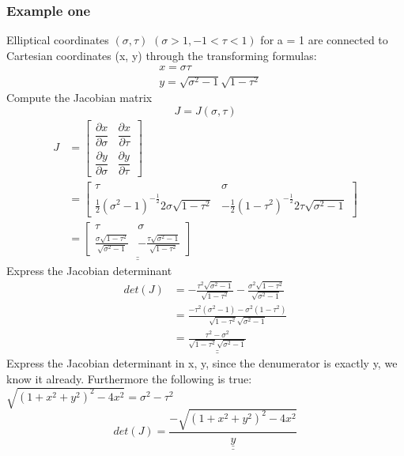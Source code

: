 \subsubsection{Example one}
Elliptical coordinates $(\sigma, \tau)$ $(\sigma>1,-1<\tau<1)$ for a = 1 are connected to Cartesian coordinates (x, y) through the transforming formulas:
$$
\begin{aligned}
&x=\sigma \tau \\
&y=\sqrt{\sigma^2-1} \sqrt{1-\tau^2}
\end{aligned}
$$
Compute the Jacobian matrix
$$
J=J(\sigma, \tau)
$$
$$
\begin{aligned}
J&=\left[\begin{array}{cc}
\dfrac{\partial x}{\partial \sigma} & \dfrac{\partial x}{\partial \tau} \\
\dfrac{\partial y}{\partial \sigma} & \dfrac{\partial y}{\partial \tau}
\end{array}\right]\\&=\left[\begin{array}{cc}
\tau&\sigma\\
\frac{1}{2}\left(\sigma^2-1\right)^{-\frac{1}{2}}2\sigma\sqrt{1-\tau^2}& -\frac{1}{2}\left(1-\tau^2\right)^{-\frac{1}{2}}2\tau\sqrt{\sigma^2-1}
\end{array}\right]\\&=\underline{\underline{\left[\begin{array}{cc}
\tau&\sigma\\
\frac{\sigma\sqrt{1-\tau^2}}{\sqrt{\sigma^2-1}}& -\frac{\tau\sqrt{\sigma^2-1}}{\sqrt{1-\tau^2}}
\end{array}\right]}}
\end{aligned}
$$
Express the Jacobian determinant
$$
\begin{aligned}
det(J)&=-\frac{\tau^2\sqrt{\sigma^2-1}}{\sqrt{1-\tau^2}}-\frac{\sigma^2\sqrt{1-\tau^2}}{\sqrt{\sigma^2-1}}
\\&=\frac{-\tau^2\left(\sigma^2-1\right)-\sigma^2\left(1-\tau^2\right)}{\sqrt{1-\tau^2}\sqrt{\sigma^2-1}}
\\&=\underline{\underline{\frac{\tau^2-\sigma^2}{\sqrt{1-\tau^2}\sqrt{\sigma^2-1}}}}
\end{aligned}
$$
Express the Jacobian determinant in {x, y}, since the denumerator is exactly y, we know it already. Furthermore the following is true: $\sqrt{\left(1+x^2+y^2\right)^2-4 x^2}=\sigma^2-\tau^2$
$$
det(J)=\underline{\underline{\frac{-\sqrt{\left(1+x^2+y^2\right)^2-4 x^2}}{y}}}
$$